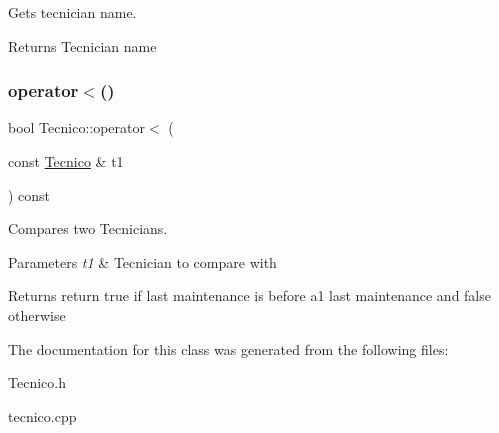 Gets tecnician name. 

\begin{DoxyReturn}{Returns}
Tecnician name 
\end{DoxyReturn}
\mbox{\label{class_tecnico_a40d2c35c86d41d1410aa6ac930159644}} 
\subsubsection{\texorpdfstring{operator$<$()}{operator<()}}
{\footnotesize\ttfamily bool Tecnico\+::operator$<$ (\begin{DoxyParamCaption}\item[{const \hyperlink{class_tecnico}{Tecnico} \&}]{t1 }\end{DoxyParamCaption}) const}



Compares two Tecnicians. 


\begin{DoxyParams}{Parameters}
{\em t1} & Tecnician to compare with\\
\hline
\end{DoxyParams}
\begin{DoxyReturn}{Returns}
return true if last maintenance is before a1 last maintenance and false otherwise 
\end{DoxyReturn}


The documentation for this class was generated from the following files\+:\begin{DoxyCompactItemize}
\item 
Tecnico.\+h\item 
tecnico.\+cpp\end{DoxyCompactItemize}
